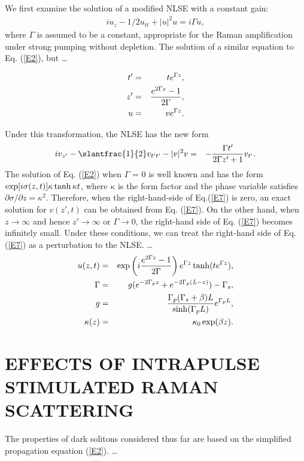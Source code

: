 We first examine the solution of a modified NLSE with a constant gain:
\begin{eqnarray}
i u_{z} - {1/2} u_{tt} + |u|^2 u  =  i \Gamma u,
\label{E2}
\end{eqnarray}
where $\Gamma $ is assumed to be a constant,
appropriate for the Raman amplification
under strong pumping without depletion.  The
solution of a similar equation to Eq. (\ref{E2}),
but \ldots
\begin{mathletters}
\begin{eqnarray}
t'  &=&  t e^{ \Gamma z }, \label{E4}  \\
z'  &=&  { e^{2 \Gamma z } - 1 \over  2 \Gamma },  \label{E5}  \\
u   &=&  v e^{ \Gamma z } .                          \label{E6}
\end{eqnarray}
\end{mathletters}
Under this transformation,  the NLSE has the new form
\begin{eqnarray}
i v_{z'} -\slantfrac{1}{2} v_{ t' t' } - |v|^2 v  &=&
- { \Gamma t' \over 2 \Gamma z' + 1} v_{t'}. \label{E7}
\end{eqnarray}
The solution of Eq. (\ref{E2}) when $\Gamma $ = 0 is well known and
has the form ${\rm exp} [i \sigma (z,t) ] \kappa \tanh \kappa t $,
where $\kappa $ is the form factor and the phase variable satisfies
$ \partial \sigma / \partial z  =  \kappa^2 $.\cite{ZA}
Therefore, when the right-hand-side of
Eq.(\ref{E7}) is zero, an exact solution for $v(z',t)$ can be
obtained from Eq. (\ref{E7}).
On the other hand, when $z \rightarrow \infty $ and hence
$z' \rightarrow \infty $ or $ \Gamma \rightarrow 0$,  the
right-hand side of Eq. (\ref{E7}) becomes infinitely small.
Under these conditions, we can treat the right-hand
side of Eq. (\ref{E7}) as a perturbation to the NLSE.
\ldots
\begin{eqnarray}
u(z,t)&=&{\rm exp}\left( i{e^{2\Gamma z}-1 \over 2\Gamma}\right)
e^{\Gamma z} \, {\rm tanh} (te^{\Gamma z}),
\label{E8}                                \\
\Gamma&=&g(e^{-2\Gamma_pz} + e^{-2\Gamma_p(L-z)}) - \Gamma_s,
\label{E9} \\
g&=&{\Gamma_p(\Gamma_s + \beta)L \over {\rm sinh}(\Gamma_pL)}
e^{\Gamma_pL} , \label{E10} \\
\kappa(z) &=& \kappa_0 \, {\rm exp}(\beta z). \label{E11}
\end{eqnarray}

\section{EFFECTS OF INTRAPULSE STIMULATED RAMAN SCATTERING}
\label{EIS}
The properties of dark solitons considered thus far are
based on the simplified propagation equation (\ref{E2}).
\ldots

